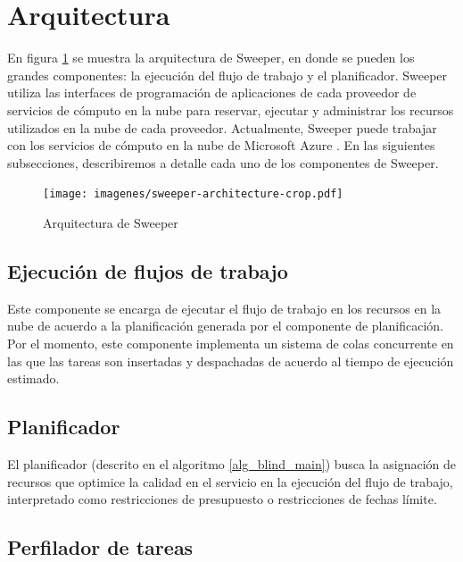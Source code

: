 \section{Arquitectura}

En figura \ref{fig:sweeper-arch} se muestra la arquitectura de Sweeper, en donde se pueden los grandes componentes: la ejecución del flujo de trabajo y el planificador. Sweeper utiliza las interfaces de programación de aplicaciones de cada proveedor de servicios de cómputo en la nube para reservar, ejecutar y administrar los recursos utilizados en la nube de cada proveedor. Actualmente, Sweeper puede trabajar con los servicios de cómputo en la nube de Microsoft Azure \cite{microsoft2015azure}. En las siguientes subsecciones, describiremos a detalle cada uno de los componentes de Sweeper.

\begin{figure}
\begin{center}
\texttt{[image: imagenes/sweeper-architecture-crop.pdf]}
\end{center}
\caption{Arquitectura de Sweeper}
\label{fig:sweeper-arch}
\end{figure}


\subsection{Ejecución de flujos de trabajo}

Este componente se encarga de ejecutar el flujo de trabajo en los recursos en la nube de acuerdo a la planificación generada por el componente de planificación. Por el momento, este componente implementa un sistema de colas concurrente en las que las tareas son insertadas y despachadas de acuerdo al tiempo de ejecución estimado.



\subsection{Planificador}

El planificador (descrito en el algoritmo \ref{alg_blind_main}) busca la asignación de recursos que optimice la calidad en el servicio en la ejecución del flujo de trabajo, interpretado como restricciones de presupuesto o restricciones de fechas límite. 



\subsection{Perfilador de tareas}

